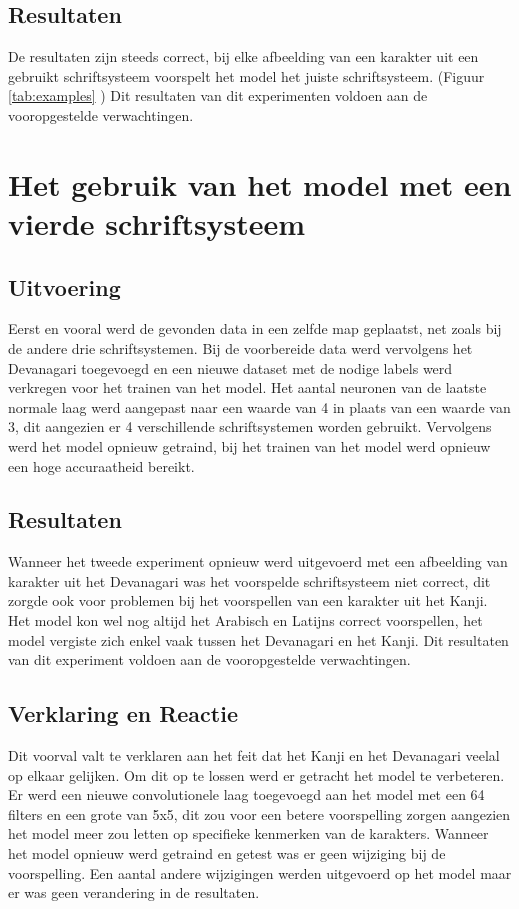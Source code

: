 \subsection{Resultaten}

De resultaten zijn steeds correct, bij elke afbeelding van een karakter uit een gebruikt schriftsysteem voorspelt het model het juiste schriftsysteem. (Figuur \ref{tab:examples} )
Dit resultaten van dit experimenten voldoen aan de vooropgestelde verwachtingen.

\section{Het gebruik van het model met een vierde schriftsysteem}

\subsection{Uitvoering}

Eerst en vooral werd de gevonden data in een zelfde map geplaatst, net zoals bij de andere drie schriftsystemen.
Bij de voorbereide data werd vervolgens het Devanagari toegevoegd en een nieuwe dataset met de nodige labels werd verkregen voor het trainen van het model.
Het aantal neuronen van de laatste normale laag werd aangepast naar een waarde van 4 in plaats van een waarde van 3, dit aangezien er 4 verschillende schriftsystemen worden gebruikt.
Vervolgens werd het model opnieuw getraind, bij het trainen van het model werd opnieuw een hoge accuraatheid bereikt. 

\subsection{Resultaten}
Wanneer het tweede experiment opnieuw werd uitgevoerd met een afbeelding van karakter uit het Devanagari was het voorspelde schriftsysteem niet correct, dit zorgde ook voor problemen bij het voorspellen van een karakter uit het Kanji.
Het model kon wel nog altijd het Arabisch en Latijns correct voorspellen, het model vergiste zich enkel vaak tussen het Devanagari en het Kanji.
Dit resultaten van dit experiment voldoen aan de vooropgestelde verwachtingen.

\subsection{Verklaring en Reactie}

Dit voorval valt te verklaren aan het feit dat het Kanji en het Devanagari veelal op elkaar gelijken.
Om dit op te lossen werd er getracht het model te verbeteren.
Er werd een nieuwe convolutionele laag toegevoegd aan het model met een 64 filters en een grote van 5x5, dit zou voor een betere voorspelling zorgen aangezien het model meer zou letten op specifieke kenmerken van de karakters.
Wanneer het model opnieuw werd getraind en getest was er geen wijziging bij de voorspelling.
Een aantal andere wijzigingen werden uitgevoerd op het model maar er was geen verandering in de resultaten.

